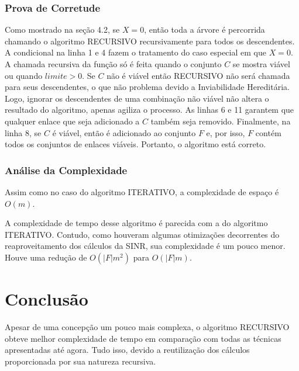 \subsubsection{Prova de Corretude}

Como mostrado na seção 4.2, se $X=0$, então toda a árvore é percorrida chamando o algoritmo RECURSIVO recursivamente para todos os descendentes. A condicional na linha 1 e 4 fazem o tratamento do caso especial em que $X=0$. A chamada recursiva da função só é feita quando o conjunto $C$ se mostra viável ou quando $limite>0$. Se $C$ não é viável então RECURSIVO não será chamada para seus descendentes, o que não problema devido a Inviabilidade Hereditária. Logo, ignorar os descendentes de uma combinação não viável não altera o resultado do algoritmo, apenas agiliza o processo. As linhas 6 e 11 garantem que qualquer enlace que seja adicionado a $C$ também seja removido. Finalmente, na linha 8, se $C$ é viável, então é adicionado ao conjunto $F$ e, por isso, $F$ contém todos os conjuntos de enlaces viáveis. Portanto, o algoritmo está correto.

\subsubsection{Análise da Complexidade}

Assim como no caso do algoritmo ITERATIVO, a complexidade de espaço é $O(m)$.

A complexidade de tempo desse algoritmo é parecida com a do algoritmo ITERATIVO. Contudo, como houveram algumas otimizações decorrentes do reaproveitamento dos cálculos da SINR, sua complexidade é um pouco menor. Houve uma redução de $O(|F|m^2)$ para $O(|F|m)$.

\section{Conclusão}

Apesar de uma concepção um pouco mais complexa, o algoritmo RECURSIVO obteve melhor complexidade de tempo em comparação com todas as técnicas apresentadas até agora. Tudo isso, devido a reutilização dos cálculos proporcionada por sua natureza recursiva. 
